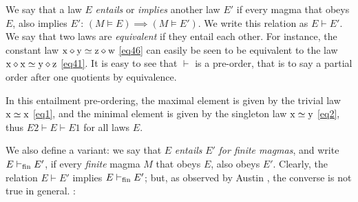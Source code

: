 We say that a law $E$ \emph{entails} or \emph{implies} another law $E'$ if every magma that obeys $E$, also implies $E'$: $(M \models E) \implies (M \models E')$.  We write this relation as $E \vdash E'$. We say that two laws are \emph{equivalent} if they entail each other. For instance, the constant law $\mathrm{x} \diamond \mathrm{y} \simeq \mathrm{z} \diamond \mathrm{w}$ \eqref{eq46} can easily be seen to be equivalent to the law $\mathrm{x} \diamond \mathrm{x} \simeq \mathrm{y} \diamond \mathrm{z}$ \eqref{eq41}.  It is easy to see that $\vdash$ is a pre-order, that is to say a partial order after one quotients by equivalence.

In this entailment pre-ordering, the maximal element is given by the trivial law $\mathrm{x}\simeq\mathrm{x}$ \eqref{eq1}, and the minimal element is given by the singleton law $\mathrm{x}\simeq \mathrm{y}$ \eqref{eq2}, thus $E2 \vdash E \vdash E1$ for all laws $E$.

We also define a variant: we say that $E$ \emph{entails} $E'$ \emph{for finite magmas}, and write $E \vdash_{\mathrm{fin}} E'$, if every \emph{finite} magma $M$ that obeys $E$, also obeys $E'$.  Clearly, the relation $E \vdash E'$ implies $E \vdash_{\mathrm{fin}} E'$; but, as observed by Austin \cite{austin_finite}, the converse is not true in general. :

